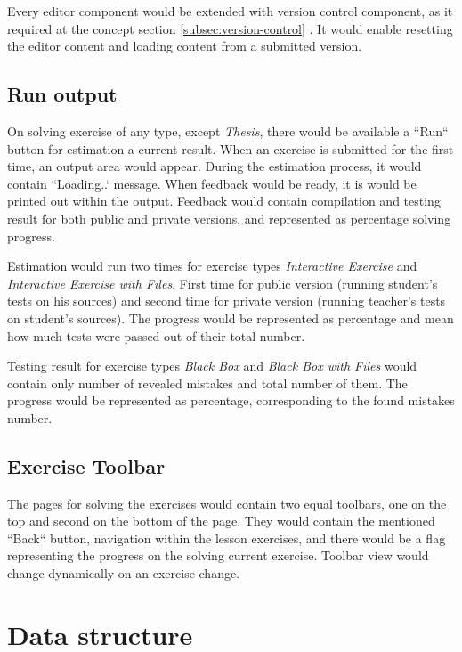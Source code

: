     Every editor component would be extended with version control component, as it required at the concept section \ref{subsec:version-control} . It would enable resetting the editor content and loading content from a submitted version.
    
    
    \subsection{Run output}
    On solving exercise of any type, except \textit{Thesis}, there would be available a ``Run`` button for estimation a current result. When an exercise is submitted for the first time, an output area would appear. During the estimation process, it would contain ``Loading..` message. When feedback would be ready, it is would be printed out within the output. Feedback would contain compilation and testing result for both public and private versions, and represented as percentage solving progress.
    
    Estimation would run two times for exercise types \textit{Interactive Exercise} and \textit{Interactive Exercise with Files}. First time for public version (running student's tests on his sources) and second time for private version (running teacher's tests on student's sources). The progress would be represented as percentage and mean how much tests were passed out of their total number.
    
    Testing result for exercise types \textit{Black Box} and \textit{Black Box with Files} would contain only number of revealed mistakes and total number of them. The progress would be represented as percentage, corresponding to the found mistakes number.
    
    
    \subsection{Exercise Toolbar}
    The pages for solving the exercises would contain two equal toolbars, one on the top and second on the bottom of the page. They would contain the mentioned ``Back`` button, navigation within the lesson exercises, and there would be a flag representing the progress on the solving current exercise. Toolbar view would change dynamically on an exercise change.


\section{Data structure}

